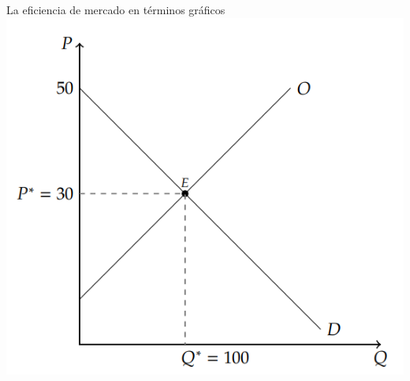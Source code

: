 \documentclass{beamer}
\begin{document}
\begin{frame}{La eficiencia de mercado en términos gráficos}
  \centering
  \includegraphics[scale=0.7]{../Figures/C17.4.png} 
\end{frame}
\end{document}
